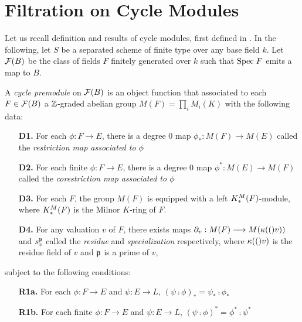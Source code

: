 \section{Filtration on Cycle Modules}

\renewcommand{\Cat}[1]{\mathbf{#1}}

Let us recall definition and results of cycle modules, first
defined in \cite{Ro96}. In the following, let $S$ be a separated 
scheme of finite type over any base field $k$. Let $\mathcal{F}(B)$ 
be the class of fields $F$ finitely generated over $k$ such that
$\mathrm{Spec}\; F$ emits a map to $B$.

\begin{definition}
A \emph{cycle premodule} on $\mathcal{F}(B)$ is an object function
that associated to each $F \in \mathcal{F}(B)$ a $\mathbb{Z}$-graded abelian
group $M(F) = \prod_i M_i(K)$ with the following data:

\begin{enumerate}
\item[\textbf{D1.}] For each $\phi: F \to E$, there is a degree 0
map $\phi_*: M(F) \to M(E)$ called the \emph{restriction map 
associated to $\phi$}

\item[\textbf{D2.}] For each finite $\phi: F \to E$, there is a 
degree 0 map $\phi^*: M(E) \to M(F)$ called the \emph{corestriction
map associated to $\phi$}

\item[\textbf{D3.}] For each $F$, the group $M(F)$ is equipped
with a left $K^M_*(F)$-module, where $K^M_*(F)$ is the Milnor
$K$-ring of $F$.

\item[\textbf{D4.}] For any valuation $v$ of $F$, there exists 
maps $\partial_{v}: M(F) \longrightarrow M(\kappa(()v))$ and $s_{v}^{\mathfrak{p}}$
called the \emph{residue} and \emph{specialization} respectively, 
where $\kappa(()v)$ is the residue field of $v$ and $\mathfrak{p}$ is 
a prime of $v$,
\end{enumerate}

subject to the following conditions:

\begin{enumerate}
\item[\textbf{R1a.}] For each $\phi: F \to E$ and $\psi: E \to L$,
$(\psi \comp \phi)_* = \psi_* \comp \phi_*$

\item[\textbf{R1b.}] For each finite $\phi: F \to E$ and $\psi: E
\to L$, $(\psi \comp \phi)^* = \phi^* \comp \psi^*$


\end{enumerate}
\end{definition}
